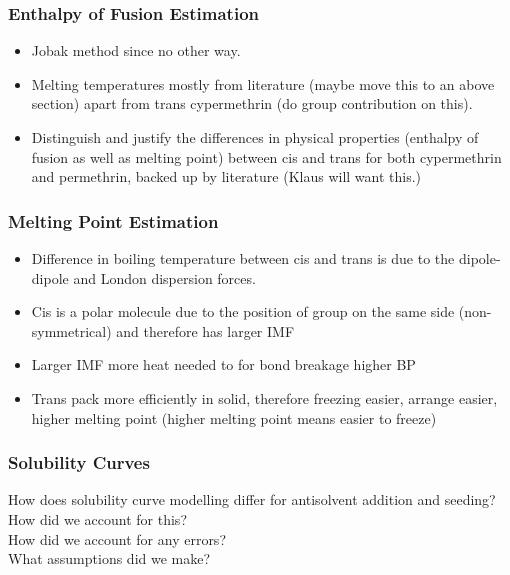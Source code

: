 \subsubsection{Enthalpy of Fusion Estimation}
\begin{itemize}
\item Jobak method since no other way.
\item Melting temperatures mostly from literature (maybe move this to an above section) apart from trans cypermethrin (do group contribution on this).
\item Distinguish and justify the differences in physical properties (enthalpy of fusion as well as melting point) between cis and trans for both cypermethrin and permethrin, backed up by literature (Klaus will want this.)
\end{itemize}

\subsubsection{Melting Point Estimation}
\begin{itemize}
\item Difference in boiling temperature between cis and trans is due to the dipole-dipole and London dispersion forces.
\item Cis is a polar molecule due to the position of group on the same side (non-symmetrical) and therefore has larger IMF
\item Larger IMF \textrightarrow more heat needed to for bond breakage \textrightarrow higher BP
\item Trans pack more efficiently in solid, therefore freezing easier, arrange easier, higher melting point (higher melting point means easier to freeze)
\end{itemize}

\subsubsection{Solubility Curves}
How does solubility curve modelling differ for antisolvent addition and seeding? \\
How did we account for this? \\
How did we account for any errors? \\ What assumptions did we make?

